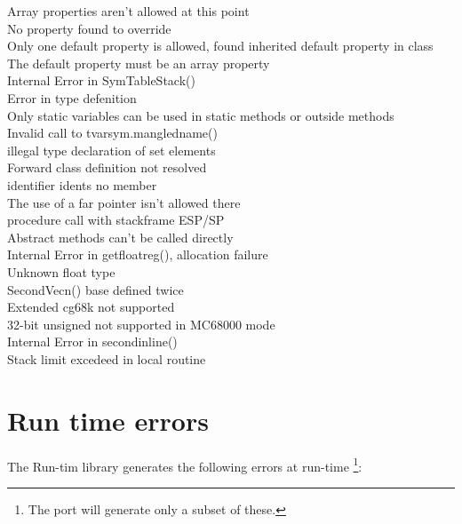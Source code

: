 \documentclass{report}
\begin{document}
\begin{description}
\item [ Array properties aren't allowed at this point ]
\item [ No property found to override ]
\item [ Only one default property is allowed, found inherited default property in class ]
\item [ The default property must be an array property ]
\item [ Internal Error in SymTableStack() ]
\item [ Error in type defenition ]
\item [ Only static variables can be used in static methods or outside methods ]
\item [ Invalid call to tvarsym.mangledname() ]
\item [ illegal type declaration of set elements ]
\item [ Forward class definition not resolved  ]
\item [ identifier idents no member ]
\item [ The use of a far pointer isn't allowed there ]
\item [ procedure call with stackframe ESP/SP ]
\item [ Abstract methods can't be called directly ]
\item [ Internal Error in getfloatreg(), allocation failure ]
\item [ Unknown float type ]
\item [ SecondVecn() base defined twice ]
\item [ Extended cg68k not supported ]
\item [ 32-bit unsigned not supported in MC68000 mode ]
\item [ Internal Error in secondinline() ]
\item [ Stack limit excedeed in local routine ]

\end{description}

\chapter{Run time errors}
The \fpc Run-tim library generates the following errors at run-time
\footnote{The \linux port will generate only a subset of these.}:
\end{document}

